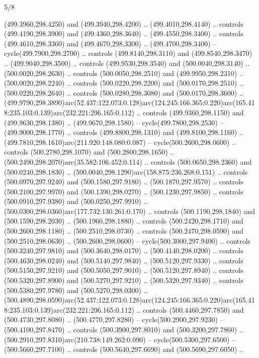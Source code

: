 \begin{flagdescription}{5/8}
\begin{scope}[xshift=0.5\flaglength,yshift=0.5\flagwidth,scale=\flagwidth/475.63]
\begin{scope}[y=0.8pt, x=0.8pt, yscale=-1, xscale=1,shift={(-450,-300)}]
\begin{scope}[cm={{1.0,0.0,0.0,1.0,(-0.0002,0.12556)}},cm={{1.0,0.0,0.0,1.0,(0.00179,0.0)}}]
\begin{scope}[cm={{1.11592,0.0,0.0,1.11592,(-106.89933,-41.77764)}}]
\begin{scope}[draw=black,fill=cfff]
\begin{scope}[fill=black]
  (499.3960,298.4250) and (499.3940,298.4200) .. (499.4010,298.4140) .. controls
  (499.4190,298.3900) and (499.4360,298.3640) .. (499.4550,298.3400) .. controls
  (499.4610,298.3360) and (499.4670,298.3300) .. (499.4700,298.3400) --
  cycle(499.7900,298.2700) .. controls (499.8140,298.3110) and
  (499.8540,298.3470) .. (499.9040,298.3500) .. controls (499.9530,298.3540) and
  (500.0040,298.3140) .. (500.0020,298.2630) .. controls (500.0050,298.2510) and
  (499.9950,298.2310) .. (500.0020,298.2240) .. controls (500.0220,298.2200) and
  (500.0170,298.2510) .. (500.0220,298.2640) .. controls (500.0280,298.3080) and
  (500.0170,298.3600) ..
  (499.9790,298.3890)arc(52.437:122.073:0.128)arc(124.245:166.365:0.220)arc(165.418:235.103:0.139)arc(232.221:296.165:0.112)
  .. controls (499.9360,298.1150) and (499.9630,298.1380) .. (499.9670,298.1580)
  -- cycle(499.7800,298.2530) -- (499.9000,298.1770) .. controls
  (499.8800,298.1310) and (499.8100,298.1160) ..
  (499.7810,298.1610)arc(211.920:148.080:0.087) -- cycle(500.2600,298.0600) ..
  controls (500.2780,298.1070) and (500.2800,298.1650) ..
  (500.2490,298.2070)arc(35.582:106.452:0.114) .. controls (500.0650,298.2360)
  and (500.0240,298.1830) .. (500.0040,298.1290)arc(158.875:236.268:0.151) ..
  controls (500.0970,297.9240) and (500.1580,297.9180) .. (500.1870,297.9570) ..
  controls (500.2100,297.9970) and (500.1390,298.0270) .. (500.1230,297.9850) ..
  controls (500.0910,297.9380) and (500.0250,297.9910) ..
  (500.0300,298.0360)arc(177.732:130.261:0.170) .. controls (500.1190,298.1840)
  and (500.1590,298.2030) .. (500.1960,298.1880) .. controls (500.2420,298.1710)
  and (500.2600,298.1180) .. (500.2510,298.0730) .. controls (500.2470,298.0590)
  and (500.2510,298.0630) .. (500.2600,298.0600) -- cycle(500.3000,297.9400) ..
  controls (500.3240,297.9810) and (500.3640,298.0170) .. (500.4140,298.0200) ..
  controls (500.4630,298.0240) and (500.5140,297.9840) .. (500.5120,297.9330) ..
  controls (500.5150,297.9210) and (500.5050,297.9010) .. (500.5120,297.8940) ..
  controls (500.5320,297.8900) and (500.5270,297.9210) .. (500.5320,297.9340) ..
  controls (500.5380,297.9780) and (500.5270,298.0300) ..
  (500.4890,298.0590)arc(52.437:122.073:0.128)arc(124.245:166.365:0.220)arc(165.418:235.103:0.139)arc(232.221:296.165:0.112)
  .. controls (500.4460,297.7850) and (500.4730,297.8080) .. (500.4770,297.8280)
  -- cycle(500.2900,297.9230) -- (500.4100,297.8470) .. controls
  (500.3900,297.8010) and (500.3200,297.7860) ..
  (500.2910,297.8310)arc(210.738:149.262:0.090) -- cycle(500.5300,297.6500) --
  (500.5660,297.7100) .. controls (500.5640,297.6690) and (500.5690,297.6050) ..

\end{scope}
\end{scope}
\end{scope}
\end{scope}
\end{scope}
\end{scope}
\end{flagdescription}
